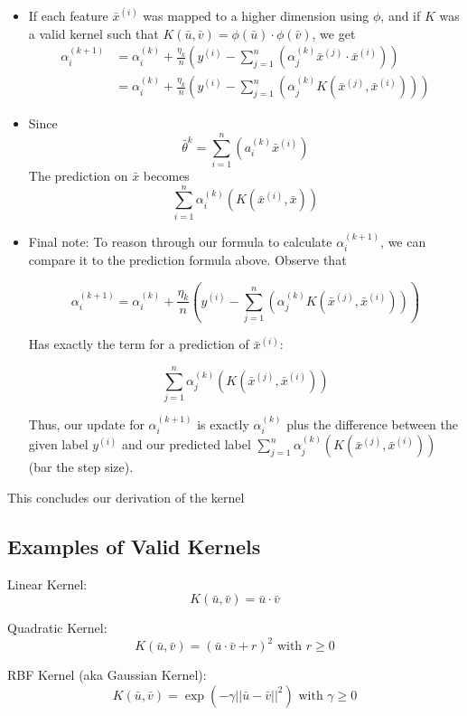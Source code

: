 \documentclass[12pt]{article}
\begin{document}
\begin{itemize}
\[			\]
		\item If each feature $\bar{x}^{(i)}$ was mapped to a higher dimension using $\phi$, and if $K$ was a valid kernel such that $K(\bar u, \bar v) = \phi(\bar u) \cdot \phi(\bar v)$, we get
			\[ 
				\begin{aligned}
					\alpha_i^{(k+1)} &= \alpha_i^{(k)} + \frac{\eta_k}n \left( y^{(i)} - \sum_{j=1}^n \left(  \alpha_j^{(k)} \bar{x}^{(j)} \cdot \bar{x}^{(i)} \right) \right)\\
													 &= \alpha_i^{(k)} + \frac{\eta_k}n \left( y^{(i)} - \sum_{j=1}^n \left( \alpha_j^{(k)} K(\bar{x}^{(j)}, \bar{x}^{(i)}) \right) \right)
				\end{aligned}
			\]
		\item Since 
			\[ \bar{\theta}^{k} = \sum_{i=1}^n (a_i^{(k)} \bar{x}^{(i)}) \]
			The prediction on $\bar x$ becomes
			\[ \sum_{i=1}^n \alpha_i^{(k)}(K(\bar{x}^{(i)}, \bar{x})) \]
		\item Final note: To reason through our formula to calculate $\alpha_i^{(k+1)}$, we can compare it to the prediction formula above. Observe that

			\[
				\alpha_i^{(k+1)} = \alpha_i^{(k)} + \frac{\eta_k}n \left( y^{(i)} - \sum_{j=1}^n \left( \alpha_j^{(k)} K(\bar{x}^{(j)}, \bar{x}^{(i)}) \right) \right)
			\]

			Has exactly the term for a prediction of $\bar x^{(i)}$:

			\[ \sum_{j=1}^n \alpha_j^{(k)}(K(\bar{x}^{(j)}, \bar{x}^{(i)})) \]

			Thus, our update for $\alpha_i^{(k+1)}$ is exactly $\alpha_i^{(k)}$ plus the difference between the given label $y^{(i)}$ and our predicted label $\sum_{j=1}^n \alpha_j^{(k)}(K(\bar{x}^{(j)}, \bar{x}^{(i)}))$ (bar the step size).

\end{itemize}

This concludes our derivation of the kernel

\subsection{Examples of Valid Kernels}

Linear Kernel:
\[ K(\bar u, \bar v) = \bar u \cdot \bar v \]

Quadratic Kernel:
\[ K(\bar u, \bar v) = (\bar u \cdot \bar v + r)^2 \text{ with } r \ge 0 \]

RBF Kernel (aka Gaussian Kernel):
\[ K(\bar u, \bar v) = \exp(-\gamma ||\bar u - \bar v||^2) \text{ with } \gamma \ge 0 \]
\end{document}
